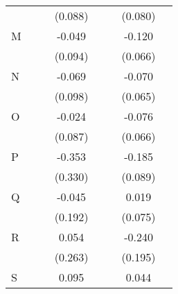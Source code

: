 \begin{longtable}{l*{3}{c}|l*{3}{c}}
	&                     &                     &     (0.088)         &                     &                     &     (0.080)         \\
	M                   &                     &                     &      -0.049         &                     &                     &      -0.120\sym{*}  \\
	&                     &                     &     (0.094)         &                     &                     &     (0.066)         \\
	N                   &                     &                     &      -0.069         &                     &                     &      -0.070         \\
	&                     &                     &     (0.098)         &                     &                     &     (0.065)         \\
	O                   &                     &                     &      -0.024         &                     &                     &      -0.076         \\
	&                     &                     &     (0.087)         &                     &                     &     (0.066)         \\
	P                   &                     &                     &      -0.353         &                     &                     &      -0.185\sym{**} \\
	&                     &                     &     (0.330)         &                     &                     &     (0.089)         \\
	Q                   &                     &                     &      -0.045         &                     &                     &       0.019         \\
	&                     &                     &     (0.192)         &                     &                     &     (0.075)         \\
	R                   &                     &                     &       0.054         &                     &                     &      -0.240         \\
	&                     &                     &     (0.263)         &                     &                     &     (0.195)         \\
	S                   &                     &                     &       0.095         &                     &                     &       0.044         \\

\end{longtable}

